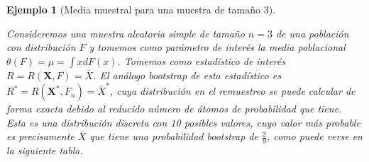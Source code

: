 \documentclass[
]{book}
\renewcommand{\mathbf}[1]{\symbf{#1}}
\theoremstyle{break}
\newtheorem{example}{Ejemplo}[chapter]
\theoremstyle{nonumberplain}
\begin{document}
\begin{example}[Media muestral para una muestra de tamaño 3]
\protect\hypertarget{exm:media3}{}\label{exm:media3}

\vspace{0.5cm}

Consideremos una muestra aleatoria simple de tamaño \(n=3\) de una
población con distribución \(F\) y tomemos como parámetro de interés la
media poblacional
\(\theta \left( F \right) =\mu =\int xdF\left( x \right)\).
Tomemos como estadístico de interés
\(R=R\left( \mathbf{X},F \right) =\bar{X}\).
El análogo bootstrap de esta estadístico es
\(R^{\ast}=R\left( \mathbf{X}^{\ast},F_n \right) =\bar{X}^{\ast}\),
cuya distribución en el remuestreo se puede calcular de forma exacta
debido al reducido número de átomos de probabilidad que tiene.
Esta es una distribución discreta con 10 posibles valores, cuyo
valor más probable es precisamente \(\bar{X}\) que tiene una
probabilidad bootstrap de \(\frac{2}{9}\), como puede verse en la
siguiente tabla.


\end{example}
\end{document}
